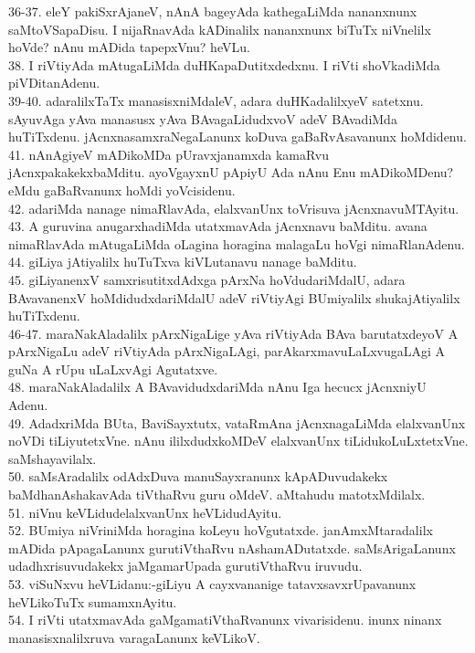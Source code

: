 \documentclass{article}
\begin{document}
36-37. eleY pakiSxrAjaneV, nAnA bageyAda kathegaLiMda nananxnunx saMtoVSapaDisu. I nijaRnavAda kADinalilx nananxnunx biTuTx niVnelilx hoVde? nAnu mADida tapepxVnu? heVLu.\\
38. I riVtiyAda mAtugaLiMda duHKapaDutitxdedxnu. I riVti shoVkadiMda piVDitanAdenu.\\
39-40. adaralilxTaTx manasisxniMdaleV, adara duHKadalilxyeV satetxnu. sAyuvAga yAva manasusx yAva BAvagaLidudxvoV adeV BAvadiMda huTiTxdenu. jAcnxnasamxraNegaLanunx koDuva gaBaRvAsavanunx hoMdidenu.\\
41. nAnAgiyeV mADikoMDa pUravxjanamxda kamaRvu jAcnxpakakekxbaMditu. ayoVgayxnU pApiyU Ada nAnu Enu mADikoMDenu? eMdu gaBaRvanunx hoMdi yoVcisidenu.\\
42. adariMda nanage nimaRlavAda, elalxvanUnx toVrisuva jAcnxnavuMTAyitu.\\
43. A guruvina anugarxhadiMda utatxmavAda jAcnxnavu baMditu. avana nimaRlavAda mAtugaLiMda oLagina horagina malagaLu hoVgi nimaRlanAdenu.\\
44. giLiya jAtiyalilx huTuTxva kiVLutanavu nanage baMditu.\\
45. giLiyanenxV samxrisutitxdAdxga pArxNa hoVdudariMdalU, adara BAvavanenxV hoMdidudxdariMdalU adeV riVtiyAgi BUmiyalilx shukajAtiyalilx huTiTxdenu.\\
46-47. maraNakAladalilx pArxNigaLige yAva riVtiyAda BAva barutatxdeyoV A pArxNigaLu adeV riVtiyAda pArxNigaLAgi, parAkarxmavuLaLxvugaLAgi A guNa A rUpu uLaLxvAgi Agutatxve.\\
48. maraNakAladalilx A BAvavidudxdariMda nAnu Iga hecucx jAcnxniyU Adenu.\\
49. AdadxriMda BUta, BaviSayxtutx, vataRmAna jAcnxnagaLiMda elalxvanUnx noVDi tiLiyutetxVne. nAnu ililxdudxkoMDeV elalxvanUnx tiLidukoLuLxtetxVne. saMshayavilalx.\\
50. saMsAradalilx odAdxDuva manuSayxranunx kApADuvudakekx baMdhanAshakavAda tiVthaRvu guru oMdeV. aMtahudu matotxMdilalx.\\
51. niVnu keVLidudelalxvanUnx heVLidudAyitu.\\
52. BUmiya niVriniMda horagina koLeyu hoVgutatxde. janAmxMtaradalilx mADida pApagaLanunx gurutiVthaRvu nAshamADutatxde. saMsArigaLanunx udadhxrisuvudakekx jaMgamarUpada gurutiVthaRvu iruvudu.\\
53. viSuNxvu heVLidanu:-giLiyu A cayxvananige tatavxsavxrUpavanunx heVLikoTuTx sumamxnAyitu.\\
54. I riVti utatxmavAda gaMgamatiVthaRvanunx vivarisidenu. inunx ninanx manasisxnalilxruva varagaLanunx keVLikoV.\\
\end{document}

